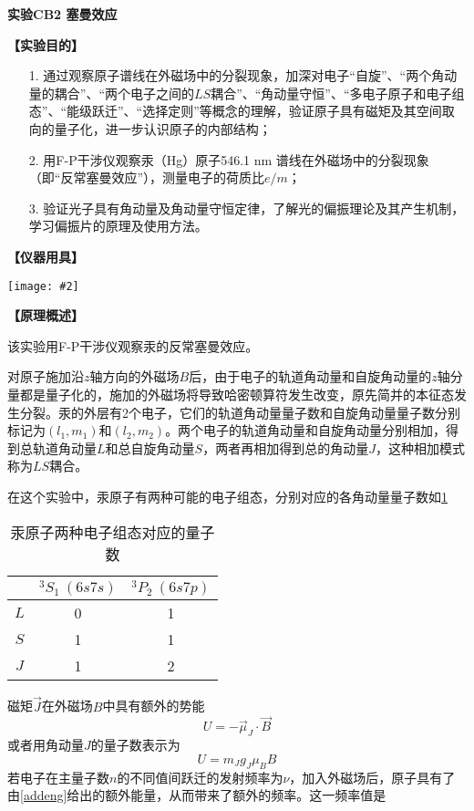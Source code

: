 \documentclass[11pt,a4paper]{ctexart}
\newcommand{\ExpeName}{实验CB2 塞曼效应}
\newcommand{\cpic}[2]{
\begin{center}
\texttt{[image: \#2]}
\end{center}
}
\newcommand{\beq}{\begin{equation}}
\newcommand{\eeq}{\end{equation}}
\begin{document}
\newpage%
\begin{center}
\LARGE{\textbf{\ExpeName}}
\end{center}
\textbf{【实验目的】}
\begin{enumerate}
 \item[1.]通过观察原子谱线在外磁场中的分裂现象，加深对电子“自旋”、“两个角动量的耦合”、“两个电子之间的$ LS $耦合”、“角动量守恒”、“多电子原子和电子组态”、“能级跃迁”、“选择定则”等概念的理解，验证原子具有磁矩及其空间取向的量子化，进一步认识原子的内部结构；
 \item[2.]用F-P干涉仪观察汞（Hg）原子546.1 nm 谱线在外磁场中的分裂现象（即“反常塞曼效应”），测量电子的荷质比$ e/m$；
 \item[3.]验证光子具有角动量及角动量守恒定律，了解光的偏振理论及其产生机制，学习偏振片的原理及使用方法。
\end{enumerate}
\textbf{【仪器用具】}
\cpic{0.3}{t1}
\textbf{【原理概述】}\par
该实验用F-P干涉仪观察汞的反常塞曼效应。\par
对原子施加沿$z$轴方向的外磁场$B$后，由于电子的轨道角动量和自旋角动量的$z$轴分量都是量子化的，施加的外磁场将导致哈密顿算符发生改变，原先简并的本征态发生分裂。汞的外层有2个电子，它们的轨道角动量量子数和自旋角动量量子数分别标记为$(l_1,m_1)$和$(l_2,m_2)$。两个电子的轨道角动量和自旋角动量分别相加，得到总轨道角动量$L$和总自旋角动量$S$，两者再相加得到总的角动量$J$，这种相加模式称为$LS$耦合。
\par
在这个实验中，汞原子有两种可能的电子组态，分别对应的各角动量量子数如\cref{table1}
\begin{table}[h!]
\centering
\caption{汞原子两种电子组态对应的量子数}
\label{table1}
\begin{tabular}{|c|c|c|}
\hline
 & $^3 S_1\ (6s7s)$ & $^3 P_2\ (6s7p)$ \\ \hline
$L$ & 0 & 1 \\ \hline
$S$ & 1 & 1 \\ \hline
$J$ & 1 & 2 \\ \hline
\end{tabular}
\end{table}
\par
磁矩$\vec{J}$在外磁场$B$中具有额外的势能
\beq
U = -\vec{\mu}_J \cdot \vec{B}
\eeq
或者用角动量$J$的量子数表示为
\beq \label{addeng}
U = m_J g_J \mu_B B
\eeq
若电子在主量子数$n$的不同值间跃迁的发射频率为$\nu$，加入外磁场后，原子具有了由\cref{addeng}给出的额外能量，从而带来了额外的频率。这一频率值是
\end{document}
